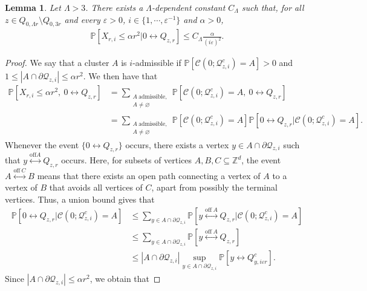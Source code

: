 \documentclass[11pt]{article}
\theoremstyle{definition}
\theoremstyle{remark}
\newcommand{\Z}{\mathbb{Z}}
\newcommand{\bP}{\mathbb{P}}
\numberwithin{equation}{section}
\theoremstyle{plain}
\newtheorem{lem}[theorem]{Lemma}
\theoremstyle{definition}
\theoremstyle{remark}
\theoremstyle{plain}
\begin{document}
\begin{lem}\label{pioneerpoint}
Let $\Lambda>3$. There exists a $\Lambda$-dependent constant $C_{\Lambda}$ such that, for all $z \in Q_{0,\Lambda r}\setminus Q_{0,3r}$ and every $\varepsilon>0$, $i \in \{1, \cdots, \varepsilon^{-1}\}$ and $\alpha>0$,
\begin{align*}
       \bP[X_{r,i}\le \alpha r^2| 0 \leftrightarrow Q_{z,r}]\le C_{\Lambda} \frac{\alpha}{(i\varepsilon)^2}.
    \end{align*}
\end{lem}
\begin{proof}
We say that a cluster $A$ is $i$-admissible if $\bP[\mathcal C(0; \mathcal Q_{z, i}^c)=A]>0$ and $1\leq |A\cap \partial \mathcal{Q}_{z,i}|\leq  \alpha r^2$. We then have that
\begin{align*}
       \bP[X_{r,i}\le \alpha r^2,\: 0 \leftrightarrow Q_{z,r}]&=\sum_{\substack{A\:\text{admissible},\\ A \neq \varnothing }}\bP[\mathcal C(0; \mathcal Q_{z, i}^c)=A,\:0 \leftrightarrow Q_{z,r}]\\
       &=\sum_{\substack{A\:\text{admissible},\\ A \neq \varnothing }}\bP[\mathcal C(0; \mathcal Q_{z, i}^c)=A]\bP[0 \leftrightarrow Q_{z,r}|\mathcal C(0; \mathcal Q_{z, i}^c)=A].
    \end{align*}
Whenever the event $\{0 \leftrightarrow Q_{z,r}\}$ occurs, there exists a vertex  $y \in A \cap \partial \mathcal Q_{z,i}$ such that $y \overset{\mathrm{off }A}{\longleftrightarrow}Q_{z,r}$ occurs. Here, for subsets of vertices $A,B,C \subseteq \Z^d$, the event $A \overset{\mathrm{off}~C}{\longleftrightarrow}B$ means that there exists an open path connecting a vertex of $A$ to a vertex of $B$ that avoids all vertices of $C$, apart from possibly the terminal vertices. Thus, a union bound gives that
    \begin{align*}
      \bP[0 \leftrightarrow Q_{z,r}|\mathcal C(0; \mathcal Q_{z, i}^c)=A]
      &\le \sum_{y \in A \cap \partial \mathcal Q_{z,i}}\bP[y \overset{\mathrm{off}~A}{\longleftrightarrow}Q_{z,r}|\mathcal C(0; \mathcal Q_{z, i}^c)=A]  \\
      &\le\sum_{y \in A \cap \partial \mathcal Q_{z,i}}\bP[y \overset{\mathrm{off}~A}{\longleftrightarrow}Q_{z,r}] \\
      &\le | A \cap \partial \mathcal Q_{z,i}|\sup_{y \in A \cap \partial \mathcal Q_{z,i}}
      \bP[y \longleftrightarrow Q_{y,i\varepsilon r}^c].
    \end{align*}
Since $| A \cap \partial \mathcal Q_{z,i}|\le \alpha r^2$, we obtain that

\end{proof}
\end{document}
